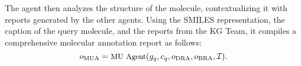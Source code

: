 




The agent then analyzes the structure of the molecule, contextualizing it with reports generated by the other agents. 
Using the SMILES representation, the caption of the query molecule, and the reports from the KG Team, it compiles a comprehensive molecular annotation report as follows:
\begin{equation} 
\small
    o_{\text{MUA}} = \text{MU Agent}(g_{q}, c_{q}, o_{\text{DRA}}, o_{\text{BRA}}, \mathcal{I}).
    \vspace{-5pt}
\end{equation}
